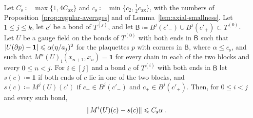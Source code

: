 \documentclass[11pt]{preprint}
\newcommand{\id}{\mathbf 1}
\DeclarePairedDelimiter{\abs}{\lvert}{\rvert}
\DeclarePairedDelimiter{\norm}{\lVert}{\rVert}
\numberwithin{equation}{section}
\begin{document}
\begin{corollary}\label{cor:axial-straight}
Let $C_{\mathrm s} \coloneqq \max\{ 1, 4C_{\mathrm{ax}} \}$ and $c_{\mathrm s} \coloneqq \min\{ c_2, \frac{1}{2}c_{\mathrm{ax}} \}$, with the numbers of Proposition~\ref{prop:regular-averages} and of Lemma~\ref{lem:axial-smallness}. Let $1 \leqslant j \leqslant k$, let $c'$ be a bond of $T^{(j)}$, and let $\mathsf B \coloneqq B^j(c'_-) \cup B^j(c'_+) \subset T^{(0)}$. Let $U$ be a gauge field on the bonds of $T^{(0)}$ with both ends in $\mathsf B$ such that $\abs{U(\partial p) - \id} \leqslant \alpha(\eta/a_j)^2$ for the plaquettes $p$ with corners in $\mathsf B$, where $\alpha \leqslant c_{\mathrm s}$, and such that $M^n(U)_{\mathfrak t}(x_{n+1}, x_n) = \id$ for every chain in each of the two blocks and every $0 \leqslant n < j$. For $i \in [j]$ and a bond $c$ of $T^{(i)}$ with both ends in $\mathsf B$ let $s(c) \coloneqq \id$ if both ends of $c$ lie in one of the two blocks, and $s(c) \coloneqq M^j(U)(c')$ if $c_- \in B^j(c'_-)$ and $c_+ \in B^j(c'_+)$. Then, for $0 \leqslant i < j$ and every such bond,
\begin{equation}\label{eq:axial-straight}
    \norm{M^i(U)(c) - s(c)} \leqslant C_{\mathrm s}\alpha\;.
\end{equation}
\end{corollary}
\end{document}
